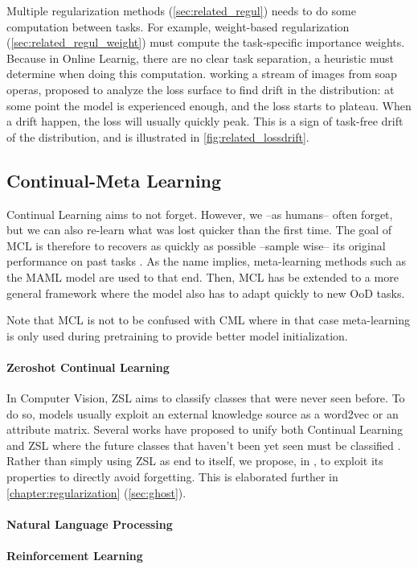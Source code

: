 Multiple regularization methods (\autoref{sec:related_regul}) needs to do some computation between
tasks. For example, weight-based regularization (\autoref{sec:related_regul_weight}) must compute
the task-specific importance weights. Because in Online Learnig, there are no clear task separation,
a heuristic must determine when doing this computation. \cite{aljundi2019taskfree} working a stream
of images from soap operas, proposed to analyze the loss surface to find drift in the distribution:
at some point the model is experienced enough, and the loss starts to plateau. When a drift happen,
the loss will usually quickly peak. This is a sign of task-free drift of the distribution, and is
illustrated in \autoref{fig:related_lossdrift}.

\subsection{Continual-Meta Learning}

Continual Learning aims to not forget. However, we --as humans-- often forget, but we can also
re-learn what was lost quicker than the first time. The goal of \ac{MCL} is therefore to recovers
as quickly as possible --sample wise-- its original performance on past tasks
\citep{he2019metacontinual}. As the name implies, meta-learning methods such as the MAML model
\citep{finn2017maml} are used to that end. Then, \ac{MCL} has be extended to a more general
framework where the model also has to adapt quickly to new \acf{OoD} tasks.

Note that \acf{MCL} is not to be confused with \acf{CML} where in that case meta-learning is only
used during pretraining to provide better model initialization.

\paragraph{Zeroshot Continual Learning}

In Computer Vision, \acf{ZSL} \citep{lampert2009zeroshot,xian2019awa2} aims to classify classes that
were never seen before. To do so, models usually exploit an external knowledge source as a word2vec
\citep{mikolov2013word2vec} or an attribute matrix. Several works have proposed to unify both
Continual Learning and \ac{ZSL} where the future classes that haven't been yet seen must be
classified \cite{lopezpaz2017gem,wei2020lifelongzeroshot,gautam2020continualzeroshot}. Rather than
simply using \ac{ZSL} as end to itself, we propose, in \citep{douillard2020ghost}, to exploit its properties to directly avoid
forgetting. This is elaborated further in \autoref{chapter:regularization} (\autoref{sec:ghost}).

\paragraph{Natural Language Processing}
\paragraph{Reinforcement Learning}
